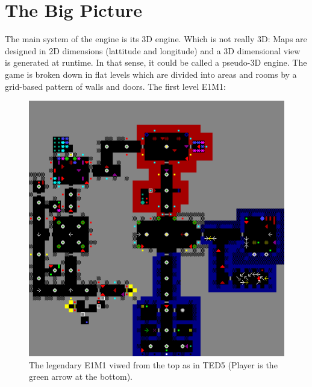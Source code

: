 \documentclass[book.tex]{subfiles}
\begin{document}
\section{The Big Picture}
The main system of the engine is its 3D engine. Which is not really 3D: Maps are designed in 2D dimensions (lattitude and longitude) and a 3D dimensional view is generated at runtime. In that sense, it could be called a pseudo-3D engine. The game is broken down in flat levels which are divided into areas and rooms by a grid-based pattern of walls and doors. The first level E1M1:\par
\begin{figure}[H]
  \centering
 \includegraphics[width=\textwidth]{imgs/e1m1.png}
 \caption{The legendary E1M1 viwed from the top as in TED5 (Player is the green arrow at the bottom).}
\end{figure}
\par 
\end{document}

